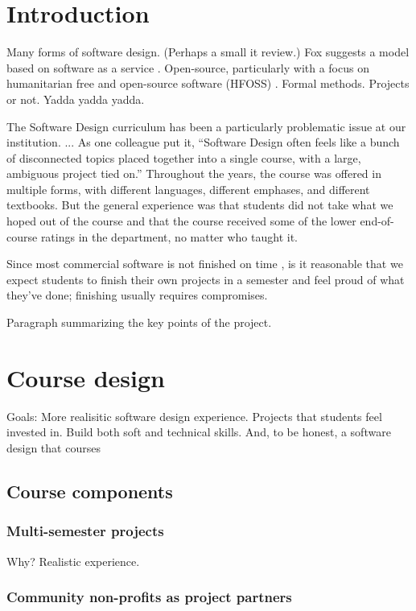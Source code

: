 \section{Introduction}

Many forms of software design.  (Perhaps a small it review.)
Fox suggests a model based on software as a service \cite{fox-2014}.
Open-source, particularly with a focus on humanitarian free and
open-source software (HFOSS) \cite{hfoss-2018}.  Formal methods.
Projects or not.  Yadda yadda yadda.

The Software Design curriculum has been a particularly problematic issue
at our institution.  ... As one colleague put it, ``Software Design often
feels like a bunch of disconnected topics placed together into a single
course, with a large, ambiguous project tied on.''  Throughout the years,
the course was offered in multiple forms, with different languages,
different emphases, and different textbooks.  But the general experience
was that students did not take what we hoped out of the course and that
the course received some of the lower end-of-course ratings in the department,
no matter who taught it.

Since most commercial software is not finished on time \cite{fox-2014},
is it reasonable that we expect students to finish their own projects
in a semester and feel proud of what they've done; finishing usually
requires compromises.

Paragraph summarizing the key points of the project.

\section{Course design}

Goals: More realisitic software design experience.  Projects that
students feel invested in.  Build both soft and technical skills.
And, to be honest, a software design that courses

\subsection{Course components}

\subsubsection{Multi-semester projects}

Why?  Realistic experience.

\subsubsection{Community non-profits as project partners}

